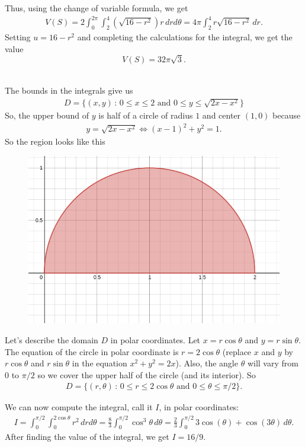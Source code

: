 	Thus, using the change of variable formula, we get
		\begin{align*}
		V(S) = 2 \int_{0}^{2\pi} \int_2^4 (\sqrt{16 - r^2}) r \, dr d\theta = 4\pi \int_2^4 r \sqrt{16-r^2} \, dr .
		\end{align*}
	Setting $u = 16 - r^2$ and completing the calculations for the integral, we get the value 
		$$
		V(S) = 32 \pi \sqrt{3} .
		$$
	
	\spc
	
	\\
	The bounds in the integrals give us
		\begin{align*}
		D = \{ (x, y) \, : \, 0 \leq x \leq 2 \text{ and } 0 \leq y \leq \sqrt{2x - x^2} \}
		\end{align*}
	So, the upper bound of $y$ is half of a circle of radius $1$ and center $(1, 0)$ because
		\begin{align*}
		y = \sqrt{2x - x^2} \iff (x-1)^2 + y^2 = 1 .
		\end{align*}
	So the region looks like this
		\begin{figure}[h]
		\centering
		\includegraphics[scale=0.5]{exo32-15-3.png}
		\end{figure}
		
	Let's describe the domain $D$ in polar coordinates. Let $x = r\cos \theta$ and $y = r \sin \theta$. The equation of the circle in polar coordinate is $r = 2\cos \theta$ (replace $x$ and $y$ by $r\cos \theta$ and $r\sin \theta$ in the equation $x^2 + y^2 = 2x$). Also, the angle $\theta$ will vary from $0$ to $\pi/2$ so we cover the upper half of the circle (and its interior). So
		\begin{align*}
		D = \{ (r, \theta ) \, : \, 0 \leq r \leq 2\cos \theta \text{ and } 0 \leq \theta \leq \pi/2 \} .
		\end{align*}
		
	We can now compute the integral, call it $I$, in polar coordinates:
		\begin{align*}
		I = \int_0^{\pi/2} \int_0^{2\cos \theta} r^2 \, dr d\theta = \frac{8}{3} \int_0^{\pi/2} \cos^3 \theta \, d \theta = \frac{2}{3} \int_0^{\pi/2} 3 \cos (\theta ) + \cos (3\theta ) \, d\theta .
		\end{align*}
	After finding the value of the integral, we get $I = 16/9$.

